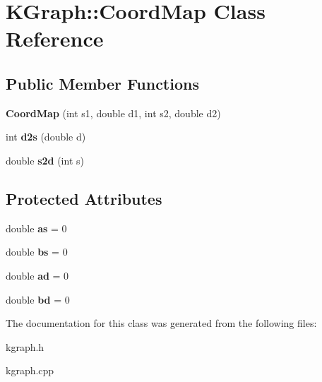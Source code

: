\hypertarget{class_k_graph_1_1_coord_map}{\section{K\-Graph\-:\-:Coord\-Map Class Reference}
\label{class_k_graph_1_1_coord_map}
}
\subsection*{Public Member Functions}
\begin{DoxyCompactItemize}
\item 
\hypertarget{class_k_graph_1_1_coord_map_a72ac3356e3d53a70c85c486cfc0961b2}{{\bfseries Coord\-Map} (int s1, double d1, int s2, double d2)}\label{class_k_graph_1_1_coord_map_a72ac3356e3d53a70c85c486cfc0961b2}

\item 
\hypertarget{class_k_graph_1_1_coord_map_abcca196bb8f198b296472f2b66ad60c9}{int {\bfseries d2s} (double d)}\label{class_k_graph_1_1_coord_map_abcca196bb8f198b296472f2b66ad60c9}

\item 
\hypertarget{class_k_graph_1_1_coord_map_a80a81e4d1f56ae6e0cb8dfc98bd8eaef}{double {\bfseries s2d} (int s)}\label{class_k_graph_1_1_coord_map_a80a81e4d1f56ae6e0cb8dfc98bd8eaef}

\end{DoxyCompactItemize}
\subsection*{Protected Attributes}
\begin{DoxyCompactItemize}
\item 
\hypertarget{class_k_graph_1_1_coord_map_a654b52c175c737e466bb60f8f9d0da26}{double {\bfseries as} = 0}\label{class_k_graph_1_1_coord_map_a654b52c175c737e466bb60f8f9d0da26}

\item 
\hypertarget{class_k_graph_1_1_coord_map_a5935710ef18e45de6611c37c21c64fec}{double {\bfseries bs} = 0}\label{class_k_graph_1_1_coord_map_a5935710ef18e45de6611c37c21c64fec}

\item 
\hypertarget{class_k_graph_1_1_coord_map_ad0587bf0739d0224f7527a6a4b555ce7}{double {\bfseries ad} = 0}\label{class_k_graph_1_1_coord_map_ad0587bf0739d0224f7527a6a4b555ce7}

\item 
\hypertarget{class_k_graph_1_1_coord_map_a3f2454f1776339ce2edd73d558be286c}{double {\bfseries bd} = 0}\label{class_k_graph_1_1_coord_map_a3f2454f1776339ce2edd73d558be286c}

\end{DoxyCompactItemize}


The documentation for this class was generated from the following files\-:\begin{DoxyCompactItemize}
\item 
kgraph.\-h\item 
kgraph.\-cpp\end{DoxyCompactItemize}
